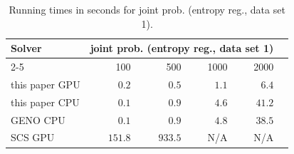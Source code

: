 
\begin{table}[h!]
\begin{center}
  \small
  \begin{tabular}{l*{5}{r}}
    \toprule
    \multirow{2}{*}{Solver} & \multicolumn{4}{c}{joint prob. (entropy reg., data set 1)} \\
    \cmidrule{2-5}
    & 100 & 500 & 1000 & 2000 \\
    \midrule
    this paper GPU & $0.2$ & $0.5$ & $1.1$ & $6.4$ \\
    this paper CPU & $0.1$ & $0.9$ & $4.6$ & $41.2$ \\
    GENO CPU & $0.1$ & $0.9$ & $4.8$ & $38.5$ \\
    SCS GPU & $151.8$ & $933.5$ & N/A & N/A \\
    \bottomrule
  \end{tabular}%
  \caption{Running times in seconds for joint prob. (entropy reg., data set 1).}
  \end{center}
\end{table}

